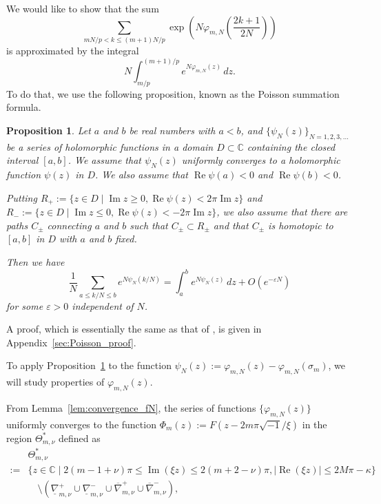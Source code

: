 \documentclass[a4paper,dvipdfmx]{amsart}
\theoremstyle{plain}
\newtheorem{prop}[thm]{Proposition}
\theoremstyle{definition}
\theoremstyle{remark}
\newcommand{\C}{\mathbb{C}}
\renewcommand{\Re}{\operatorname{Re}}
\renewcommand{\Im}{\operatorname{Im}}
\renewcommand{\i}{\sqrt{-1}}
\newcommand{\saddle}{\sigma}
\numberwithin{equation}{section}
\begin{document}
\par
We would like to show that the sum 
\begin{equation*}
  \sum_{mN/p<k\le(m+1)N/p}
  \exp\left(N\varphi_{m,N}\left(\frac{2k+1}{2N}\right)\right)
\end{equation*}
is approximated by the integral
\begin{equation*}
  N\int_{m/p}^{(m+1)/p}e^{N\varphi_{m,N}(z)}\,dz.
\end{equation*}
To do that, we use the following proposition, known as the Poisson summation formula.
\begin{prop}\label{prop:Poisson}
Let $a$ and $b$ be real numbers with $a<b$, and $\{\psi_N(z)\}_{N=1,2,3,\dots}$ be a series of holomorphic functions in a domain $D\subset\C$ containing the closed interval $[a,b]$.
We assume that $\psi_N(z)$ uniformly converges to a holomorphic function $\psi(z)$ in $D$.
We also assume that $\Re{\psi(a)}<0$ and $\Re{\psi(b)}<0$.
\par
Putting $R_{+}:=\{z\in D\mid\Im{z}\ge0,\Re{\psi(z)}<2\pi\Im{z}\}$ and $R_{-}:=\{z\in D\mid\Im{z}\le0,\Re{\psi(z)}<-2\pi\Im{z}\}$, we also assume that there are paths $C_{\pm}$ connecting $a$ and $b$ such that $C_{\pm}\subset R_{\pm}$ and that $C_{\pm}$ is homotopic to $[a,b]$ in $D$ with $a$ and $b$ fixed.
\par
Then we have
\begin{equation*}
  \frac{1}{N}\sum_{a\le k/N\le b}e^{N\psi_N(k/N)}
  =
  \int_{a}^{b}e^{N\psi_N(z)}\,dz+O(e^{-\varepsilon N})
\end{equation*}
for some $\varepsilon>0$ independent of $N$.
\end{prop}
A proof, which is essentially the same as that of \cite[Proposition~4.2]{Ohtsuki:QT2016}, is given in Appendix~\ref{sec:Poisson_proof}.
\par
To apply Proposition~\ref{prop:Poisson} to the function $\psi_N(z):=\varphi_{m,N}(z)-\varphi_{m,N}(\saddle_m)$, we will study properties of $\varphi_{m,N}(z)$.
\par
From Lemma~\ref{lem:convergence_fN}, the series of functions $\{\varphi_{m,N}(z)\}$ uniformly converges to the function $\Phi_{m}(z):=F(z-2m\pi\i/\xi)$ in the region $\Theta^{\ast}_{m,\nu}$ defined as
\begin{equation}\label{eq:convergence_Phi}
\begin{split}
  &\Theta^{\ast}_{m,\nu}
  \\
  :=&
  \{z\in\C\mid2(m-1+\nu)\pi\le\Im(\xi z)\le2(m+2-\nu)\pi,|\Re(\xi z)|\le2M\pi-\kappa\}
  \\
  &\quad\setminus
  \left(
    \underline{\nabla}^{+}_{m,\nu}
    \cup
    \underline{\nabla}^{-}_{m,\nu}
    \cup
    \overline{\nabla}^{+}_{m,\nu}
    \cup
    \overline{\nabla}^{-}_{m,\nu}
  \right),
\end{split}
\end{equation}
\end{document}
